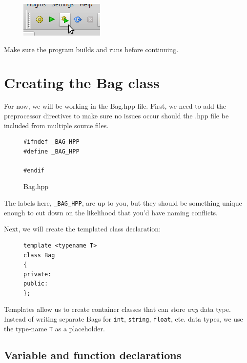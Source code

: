             \begin{figure}[h]
                \centering
                \includegraphics{images-2018-01/codeblocks_buildrun.png}
            \end{figure}

            Make sure the program builds and runs before continuing.

    \chapter{Creating the Bag class}

        For now, we will be working in the Bag.hpp file. First, we need
        to add the preprocessor directives to make sure no issues occur
        should the .hpp file be included from multiple source files.

\begin{figure}[h]
\begin{lstlisting}[style=code]
#ifndef _BAG_HPP
#define _BAG_HPP

#endif
\end{lstlisting}
\caption*{Bag.hpp}
\end{figure}

        The labels here, \texttt{\_BAG\_HPP}, are up to you,
        but they should be something unique enough to cut down on the
        likelihood that you'd have naming conflicts.

        Next, we will create the templated class declaration:

\begin{figure}[h]
\begin{lstlisting}[style=code]
template <typename T>
class Bag
{
private:
public:
};
\end{lstlisting}
\end{figure}

        Templates allow us to create container classes that can store
        \textit{any} data type. Instead of writing separate Bags for \texttt{int},
        \texttt{string}, \texttt{float}, etc. data types, we use the
        type-name \texttt{T} as a placeholder.

        \newpage

        \section{Variable and function declarations}

